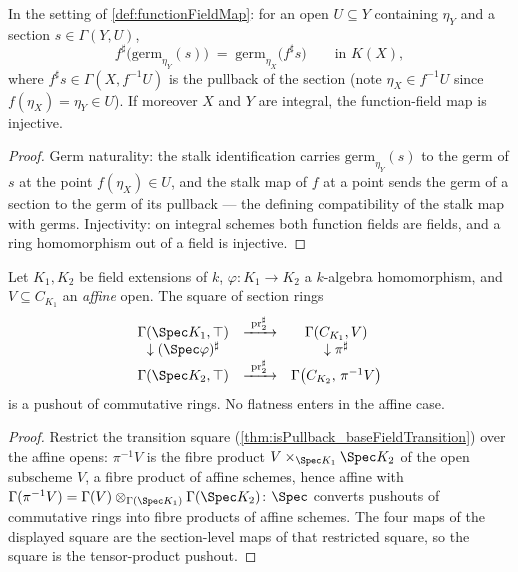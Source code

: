 \begin{lemma}
  \label{lem:functionFieldMap_germ}
  \leanok
  In the setting of \ref{def:functionFieldMap}: for an open \(U \subseteq Y\) containing
  \(\eta_Y\) and a section \(s \in \Gamma(Y, U)\),
  \[
    f^{\sharp}\bigl(\mathrm{germ}_{\eta_Y}(s)\bigr)
      \;=\; \mathrm{germ}_{\eta_X}\bigl(f^{\sharp}s\bigr)
      \qquad \text{in } K(X),
  \]
  where \(f^{\sharp}s \in \Gamma(X, f^{-1}U)\) is the pullback of the section (note
  \(\eta_X \in f^{-1}U\) since \(f(\eta_X) = \eta_Y \in U\)). If moreover \(X\) and
  \(Y\) are integral, the function-field map is injective.
\end{lemma}
\begin{proof}
  \leanok
  Germ naturality: the stalk identification carries \(\mathrm{germ}_{\eta_Y}(s)\) to the
  germ of \(s\) at the point \(f(\eta_X) \in U\), and the stalk map of \(f\) at a point
  sends the germ of a section to the germ of its pullback --- the defining compatibility
  of the stalk map with germs. Injectivity: on integral schemes both function fields are
  fields, and a ring homomorphism out of a field is injective.
\end{proof}

\begin{theorem}
  \label{thm:isPushout_transitionSections}
  \leanok
  Let \(K_1, K_2\) be field extensions of \(k\), \(\varphi : K_1 \to K_2\) a
  \(k\)-algebra homomorphism, and \(V \subseteq C_{K_1}\) an \emph{affine} open. The
  square of section rings
  \[
    \begin{array}{ccc}
      \Gamma(\Spec K_1, \top) & \xrightarrow{\ \mathrm{pr}_2^{\sharp}\ } &
        \Gamma(C_{K_1}, V) \\
      \downarrow (\Spec\varphi)^{\sharp} & & \downarrow \pi^{\sharp} \\
      \Gamma(\Spec K_2, \top) & \xrightarrow{\ \mathrm{pr}_2^{\sharp}\ } &
        \Gamma\bigl(C_{K_2},\, \pi^{-1}V\bigr)
    \end{array}
  \]
  is a pushout of commutative rings. No flatness enters in the affine case.
\end{theorem}
\begin{proof}
  \leanok
  Restrict the transition square (\ref{thm:isPullback_baseFieldTransition}) over the
  affine opens: \(\pi^{-1}V\) is the fibre product \(V \times_{\Spec K_1} \Spec K_2\) of
  the open subscheme \(V\), a fibre product of affine schemes, hence affine with
  \(\Gamma(\pi^{-1}V) = \Gamma(V) \otimes_{\Gamma(\Spec K_1)} \Gamma(\Spec K_2)\):
  \(\Spec\) converts pushouts of commutative rings into fibre products of affine
  schemes. The four maps of the displayed square are the section-level maps of that
  restricted square, so the square is the tensor-product pushout.
\end{proof}

